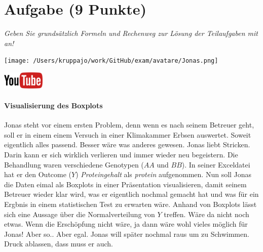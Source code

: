 \documentclass[a4paper, 9pt]{scrartcl}\usepackage[]{graphicx}\usepackage[]{xcolor}
\begin{document}
\section{Aufgabe \hfill (9 Punkte)}

\textit{Geben Sie grundsätzlich Formeln und Rechenweg zur Lösung der Teilaufgaben mit an!} \\[1Ex]
 

 
\begin{minipage}[t]{0.5\textwidth}
\texttt{[image: /Users/kruppajo/work/GitHub/exam/avatare/Jonas.png]}
\end{minipage}
\begin{minipage}[t]{0.5\textwidth}
\hfill
\href{https://youtu.be/0xc0jIPeiyw}{\includegraphics[width = 2cm]{img/youtube}}
\end{minipage}
\vspace{-3ex}



\paragraph{Visualisierung des Boxplots}

Jonas steht vor einem ersten Problem, denn wenn es nach seinem Betreuer geht, soll er in einem einem Versuch in einer Klimakammer Erbsen auswertet. Soweit eigentlich alles passend. Besser wäre was anderes gewesen. Jonas liebt Stricken. Darin kann er sich wirklich verlieren und immer wieder neu begeistern. Die Behandlung waren verschiedene Genotypen ($AA$ und $BB$). In seiner Exceldatei hat er den Outcome ($Y$) \textit{Proteingehalt} als \textit{protein} aufgenommen. Nun soll Jonas die Daten eimal als Boxplots in einer Präsentation visualisieren, damit seinem Betreuer wieder klar wird, was er eigentlich nochmal gemacht hat und was für ein Ergbnis in einem statistischen Test zu erwarten wäre. Anhand von Boxplots lässt sich eine Aussage über die Normalverteilung von $Y$ treffen. Wäre da nicht noch etwas. Wenn die Erschöpfung nicht wäre, ja dann wäre wohl vieles möglich für Jonas! Aber so.. Aber egal. Jonas will später nochmal raus um zu Schwimmen. Druck ablassen, dass muss er auch.
\end{document}
